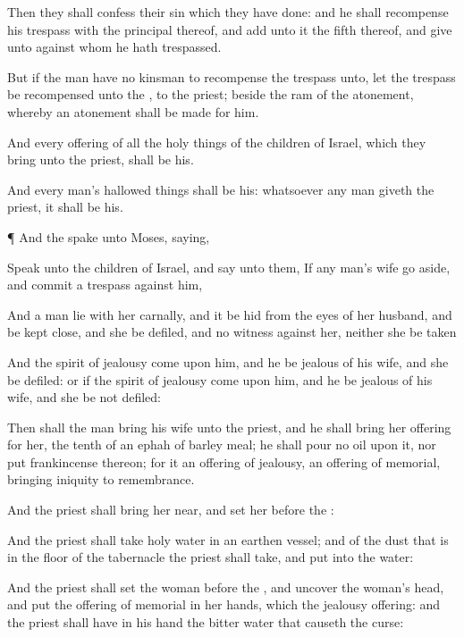 {Then they shall
confess their
sin which they have
done: and he shall
recompense his
trespass with the
principal thereof, and
add unto it the
fifth
{} thereof, and
give
{} unto
{} against whom he hath
trespassed.

But if the
man have no
kinsman to
recompense the
trespass unto, let the
trespass be
recompensed unto the
{},
{} to the
priest; beside the
ram of the
atonement, whereby an atonement shall be
made for him.

And every
offering of all the holy
things of the
children of
Israel, which they
bring unto the
priest, shall be his.

And every
man’s hallowed
things shall be his: whatsoever any
man
giveth the
priest, it shall be his.


\par }{\PP {}¶ And the
{}
spake unto
Moses,
saying,

Speak unto the
children of
Israel, and
say unto them, If
any
man’s
wife go
aside, and
commit a
trespass against him,

And a
man
lie with her
carnally, and it be
hid from the
eyes of her
husband, and be kept
close, and she be
defiled, and
{} no
witness against her, neither she be
taken
{}

And the
spirit of
jealousy
come upon him, and he be
jealous of his
wife, and she be
defiled: or if the
spirit of
jealousy
come upon him, and he be
jealous of his
wife, and she be not
defiled:

Then shall the
man
bring his
wife unto the
priest, and he shall
bring her
offering for her, the
tenth
{} of an
ephah of
barley
meal; he shall
pour no
oil upon it, nor
put
frankincense thereon; for it
{} an
offering of
jealousy, an
offering of
memorial,
bringing
iniquity to
remembrance.

And the
priest shall bring her
near, and
set her
before the
{}:

And the
priest shall
take
holy
water in an
earthen
vessel; and of the
dust that is in the
floor of the
tabernacle the
priest shall
take, and
put
{} into the
water:

And the
priest shall
set the
woman
before the
{}, and
uncover the
woman’s
head, and
put the
offering of
memorial in her
hands, which
{} the
jealousy
offering: and the
priest shall have in his
hand the
bitter
water that causeth the
curse:

}
